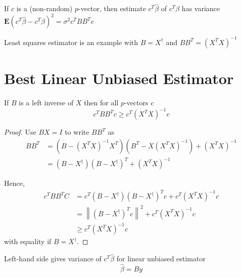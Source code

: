 \begin{theorem}
    If $ c $ is a (non-random) $ p $-vector, then estimate $ c^{T} \hat{\beta} $ of $ c^{T} \beta $ has variance
$ \mathbf{E}\left(c^{T} \hat{\beta}-c^{T} \beta\right)^{2}=\sigma^{2} c^{T} B B^{T} c $
\end{theorem}

\begin{corollary}
    Least squares estimator is an example with $ B=X^{\dagger} $ and $ B B^{T}=\left(X^{T} X\right)^{-1} $
\end{corollary}



\section{Best Linear Unbiased Estimator}

\begin{theorem}
    If $ B $ is a left inverse of $ X $ then for all $ p $-vectors $ c $
\begin{equation}
c^{T} B B^{T} c \geq c^{T}\left(X^{T} X\right)^{-1} c
\end{equation}
\end{theorem}


\begin{proof}
    Use $ B X=I $ to write $ B B^{T} $ as
\begin{equation}
\begin{aligned}
B B^{T} &=\left(B-\left(X^{T} X\right)^{-1} X^{T}\right)\left(B^{T}-X\left(X^{T} X\right)^{-1}\right)+\left(X^{T} X\right)^{-1} \\
&=\left(B-X^{\dagger}\right)\left(B-X^{\dagger}\right)^{T}+\left(X^{T} X\right)^{-1}
\end{aligned}
\end{equation}

Hence,
\begin{equation}
\begin{aligned}
c^{T} B B^{T} C &=c^{T}\left(B-X^{\dagger}\right)\left(B-X^{\dagger}\right)^{T} c+c^{T}\left(X^{T} X\right)^{-1} c \\
&=\left\|\left(B-X^{\dagger}\right)^{T} c\right\|^{2}+c^{T}\left(X^{T} X\right)^{-1} c \\
& \geq c^{T}\left(X^{T} X\right)^{-1} c
\end{aligned}
\end{equation}
with equality if $ B=X^{\dagger} $.
\end{proof}

\begin{corollary}
    Left-hand side gives variance of $ c^{T} \hat{\beta} $ for linear unbiased estimator
\begin{equation}
\hat{\beta}=B y
\end{equation}
\end{corollary}

